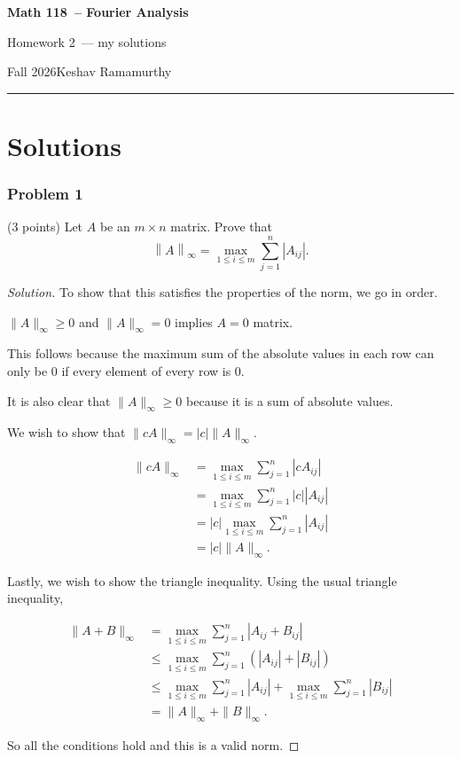 \documentclass[11pt]{article}
\newcommand{\studentname}{Keshav Ramamurthy}
\newcommand{\coursename}{Math 118}
\newcommand{\courselongname}{Fourier Analysis}
\newcommand{\assignment}{Homework 2}
\newcommand{\term}{Fall 2026}
\newcommand{\1}{\mathbf{1}}
\newcommand{\abs}[1]{\left\lvert#1\right\rvert}
\newcommand{\norm}[1]{\left\lVert#1\right\rVert}
\theoremstyle{definition}
\newenvironment{solution}{\begin{proof}[Solution]}{\end{proof}}
\begin{document}
\begin{center}
  {\Large\sffamily\bfseries \coursename\ -- \courselongname}\par\vspace{3pt}
  {\sffamily \assignment\ — my solutions}\par\vspace{3pt}
  {\small\sffamily \term\quad\textbullet\quad \studentname}
\end{center}
\medskip
\hrule
\bigskip


\clearpage

\section*{Solutions}

\subsubsection*{Problem 1}
(3 points) Let $A$ be an $m\times n$ matrix. Prove that
\[
  \norm{A}_\infty=\max_{1\le i\le m}\sum_{j=1}^n\abs{A_{ij}}.
\]

\begin{solution}
To show that this satisfies the properties of the norm, we go in order.

$\|A\|_\infty\ge0$ and $\|A\|_\infty=0$ implies $A=0$ matrix.

This follows because the maximum sum of the absolute values in each row can only be $0$ if every element of every row is $0$.

\par It is also clear that $\|A\|_\infty\ge0$ because it is a sum of absolute values.

\par We wish to show that $\|cA\|_\infty=|c|\|A\|_\infty$.

\[
\begin{aligned}
\|cA\|_\infty
&= \max_{1\le i\le m}\sum_{j=1}^n |cA_{ij}|\\
&= \max_{1\le i\le m}\sum_{j=1}^n |c||A_{ij}|\\
&= |c|\max_{1\le i\le m}\sum_{j=1}^n |A_{ij}|\\
&= |c|\|A\|_\infty.
\end{aligned}
\]

\par Lastly, we wish to show the triangle inequality. Using the usual triangle inequality,

\[
\begin{aligned}
\|A+B\|_\infty
&= \max_{1\leq i\leq m}\sum_{j=1}^n |A_{ij}+B_{ij}|\\
&\leq \max_{1\leq i\leq m}\sum_{j=1}^n
\left(|A_{ij}|+|B_{ij}|\right)\\
&\leq \max_{1\leq i\leq m}\sum_{j=1}^n |A_{ij}|
+\max_{1\leq i\leq m}\sum_{j=1}^n |B_{ij}|\\
&= \|A\|_\infty+\|B\|_\infty.
\end{aligned}
\]

So all the conditions hold and this is a valid norm.
\end{solution}
\end{document}
